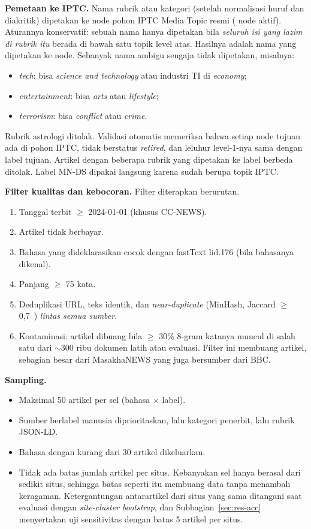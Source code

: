 \documentclass[journal]{IEEEtran}
\newcommand{\eng}[1]{\textit{#1}}   %
\begin{document}
\textbf{Pemetaan ke IPTC.} Nama rubrik atau kategori (setelah normalisasi huruf dan diakritik) dipetakan ke node pohon IPTC Media Topic resmi ( node aktif). Aturannya konservatif: sebuah nama hanya dipetakan bila \emph{seluruh isi yang lazim di rubrik itu} berada di bawah satu topik level atas. Hasilnya adalah  nama yang dipetakan ke  node. Sebanyak  nama ambigu sengaja tidak dipetakan, misalnya:
\begin{itemize}
  \item \eng{tech}: bisa \eng{science and technology} atau industri TI di \eng{economy};
  \item \eng{entertainment}: bisa \eng{arts} atau \eng{lifestyle};
  \item \eng{terrorism}: bisa \eng{conflict} atau \eng{crime}.
\end{itemize}
Rubrik astrologi ditolak. Validasi otomatis memeriksa bahwa setiap node tujuan ada di pohon IPTC, tidak berstatus \eng{retired}, dan leluhur level-1-nya sama dengan label tujuan. Artikel dengan beberapa rubrik yang dipetakan ke label berbeda ditolak. Label MN-DS dipakai langsung karena sudah berupa topik IPTC.

\textbf{Filter kualitas dan kebocoran.} Filter diterapkan berurutan.
\begin{enumerate}
  \item Tanggal terbit $\ge$ 2024-01-01 (khusus CC-NEWS).
  \item Artikel tidak berbayar.
  \item Bahasa yang dideklarasikan cocok dengan fastText lid.176 (bila bahasanya dikenal).
  \item Panjang $\ge$ 75 kata.
  \item Deduplikasi URL, teks identik, dan \eng{near-duplicate} (MinHash, Jaccard $\ge$ 0,7~\cite{lee2022dedup}) \emph{lintas semua sumber}.
  \item Kontaminasi: artikel dibuang bila $\ge$ 30\% 8-gram katanya muncul di salah satu dari $\sim$300 ribu dokumen latih atau evaluasi. Filter ini membuang  artikel, sebagian besar dari MasakhaNEWS yang juga bersumber dari BBC.
\end{enumerate}

\textbf{Sampling.}
\begin{itemize}
  \item Maksimal 50 artikel per sel (bahasa $\times$ label).
  \item Sumber berlabel manusia diprioritaskan, lalu kategori penerbit, lalu rubrik JSON-LD.
  \item Bahasa dengan kurang dari 30 artikel dikeluarkan.
  \item Tidak ada batas jumlah artikel per situs. Kebanyakan sel hanya berasal dari sedikit situs, sehingga batas seperti itu membuang data tanpa menambah keragaman. Ketergantungan antarartikel dari situs yang sama ditangani saat evaluasi dengan \eng{site-cluster bootstrap}, dan Subbagian~\ref{sec:res-acc} menyertakan uji sensitivitas dengan batas 5 artikel per situs.
\end{itemize}
\end{document}
